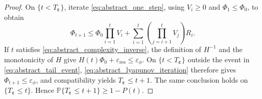 \documentclass[10pt,a4paper]{amsart}
\theoremstyle{plain}
\theoremstyle{definition}
\theoremstyle{remark}
\begin{document}
\begin{proof}
\label{proof_bigtheorem}
On $\{t<T_{\boldsymbol\varepsilon}\}$, iterate \eqref{eq:abstract_one_step}, using $V_i\geq0$ and $\Phi_1\leq\Phi_0$, to obtain
\begin{equation}\label{eq:abstract_lyapunov_iteration}
\textstyle\Phi_{t+1}
\le
\Phi_0\prod_{i=1}^tV_i
+
\sum_{i=1}^t
\left(\prod_{j=i+1}^tV_j\right)R_i.
\end{equation}
If \(t\) satisfies \eqref{eq:abstract_complexity_inverse}, the
definition of \(H^{-1}\) and the monotonicity of \(H\) give
\(H(t)\Phi_0+\varepsilon_{\mathrm{res}}\leq\varepsilon_\phi\).
On \(\{t<T_{\boldsymbol\varepsilon}\}\) outside the event in
\eqref{eq:abstract_tail_event},
\eqref{eq:abstract_lyapunov_iteration} therefore gives
\(\Phi_{t+1}\leq\varepsilon_\phi\), and compatibility yields
\(T_{\boldsymbol\varepsilon}\leq t+1\).
The same conclusion holds on \(\{T_{\boldsymbol\varepsilon}\leq t\}\).
Hence \(\mathbb P\{T_{\boldsymbol\varepsilon}\leq t+1\}\geq1-P(t)\).
\end{proof}
\end{document}
